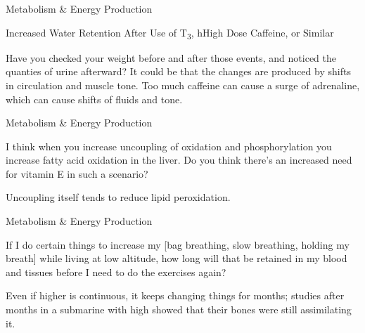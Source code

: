 \documentclass[11pt,oneside,openany,extrafontsizes]{memoir}
\begin{document}
\begin{standalonequote}{Metabolism \& Energy Production}
    \begin{note}
        Increased Water Retention After Use of T\textsubscript{3}, hHigh Dose Caffeine, or Similar
    \end{note}

    \begin{answer}
        Have you checked your weight before and after those events, and noticed the quanties of urine afterward? It could be that the changes are produced by shifts in circulation and muscle tone. Too much caffeine can cause a surge of adrenaline, which can cause shifts of fluids and tone.
    \end{answer}
\end{standalonequote}

\begin{qaexchange}{Metabolism \& Energy Production}

    \begin{question}
        I think when you increase uncoupling of oxidation and phosphorylation you increase fatty acid oxidation in the liver. Do you think there's an increased need for vitamin E in such a scenario? 
    \end{question}

    \begin{answer}
      Uncoupling itself tends to reduce lipid peroxidation.
    \end{answer}
\end{qaexchange}

\begin{qaexchange}{Metabolism \& Energy Production}

    \begin{question}
        If I do certain things to increase my  [bag breathing, slow breathing, holding my breath] while living at low altitude, how long will that  be retained in my blood and tissues before I need to do the exercises again?
    \end{question}

    \begin{answer}
      Even if higher  is continuous, it keeps changing things for months; studies after months in a submarine with high  showed that their bones were still assimilating it.
    \end{answer}
\end{qaexchange}
\end{document}
